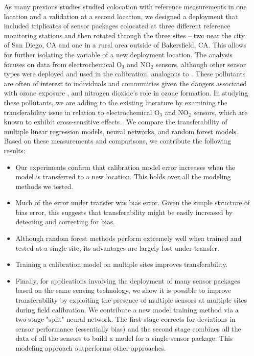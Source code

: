 \documentclass[journal abbreviation, manuscript]{copernicus}
\newcommand{\textus}[1]{$_{\text{#1}}$}
\begin{document}
As many previous studies studied colocation with reference measurements in one location and a validation at a second location, we designed a deployment that included triplicates of sensor packages colocated at three different reference monitoring stations and then rotated through the three sites – two  near the city of San Diego, CA and one in a rural area outside of Bakersfield, CA.   This allows for further isolating the variable of a new deployment location. The analysis focuses on data from electrochemical O\textus{3} and NO\textus{2} sensors, although other sensor types were deployed and used in the calibration, analogous to \citep{Bigi2018Performance}.  These pollutants are often of interest to individuals and communities given the dangers associated with ozone exposure \citep{Brunekreef2002Air}, and nitrogen dioxide’s role in ozone formation. In studying these pollutants, we are adding to the existing literature by examining the transferability issue in relation to electrochemical O\textus{3} and NO\textus{2} sensors, which are known to exhibit cross-sensitive effects \citep{SPINELLE2015480}.  We compare the transferability of multiple linear regression models, neural networks, and random forest models.  Based on these measurements and comparisons, we contribute the following results:

\begin{itemize}
\item Our experiments confirm that calibration model error increases when the model is transferred to a new location.  This holds over all the modeling methods we tested.
\item Much of the error under transfer was bias error.  Given the simple structure of bias error, this suggests that transferability might be easily increased by detecting and correcting for bias.
\item Although random forest methods perform extremely well when trained and tested at a single site, its advantages are largely lost under transfer.
\item Training a calibration model on multiple sites improves transferability.
\item Finally, for applications involving the deployment of many sensor packages based on the same sensing technology, we show it is possible to improve transferability by exploiting the presence of multiple sensors at multiple sites during field calibration.  We contribute a new model training method via a two-stage "split" neural network.  The first stage corrects for deviations in sensor performance (essentially bias) and the second stage combines all the data of all the sensors to build a model for a single sensor package.  This modeling approach outperforms other approaches.
\end{itemize}
 
\end{document}
